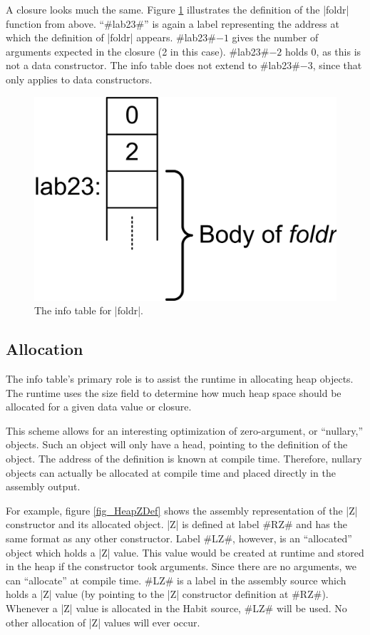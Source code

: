 \documentclass[11pt]{article}
\begin{document}
A closure looks much the same. Figure \ref{fig_foldr_Layout} illustrates the
definition of the |foldr| function from above. ``#lab23#'' is again a
label representing the address at which the definition of |foldr|
appears. #lab23#$ - 1$ gives the number of arguments expected in the
closure (2 in this case). #lab23#$ - 2$ holds 0, as this is not a data
constructor. The info table does not extend to #lab23#$ - 3$,
since that only applies to data constructors.

\begin{figure}\centering
\includegraphics{fig_foldr_Layout}
\caption{The info table for |foldr|.}
\label{fig_foldr_Layout}
\end{figure}

\subsection{Allocation}
\label{subsec_allocation}
The info table's primary role is to assist the runtime in allocating
heap objects. The runtime uses the size field to determine how much
heap space should be allocated for a given data value or closure. 

This scheme allows for an interesting optimization of zero-argument,
or ``nullary,'' objects. Such an object will only have a head,
pointing to the definition of the object. The address of the
definition is known at compile time. Therefore, nullary objects can
actually be allocated at compile time and placed directly in the
assembly output. 

For example, figure \ref{fig_HeapZDef} shows the assembly
representation of the |Z| constructor and its allocated object. |Z| is defined
at label #RZ# and has the same format as any other constructor. Label
#LZ#, however, is an ``allocated'' object which holds a |Z|
value. This value would be created at runtime and stored in the heap
if the constructor took arguments. Since there are no arguments, we
can ``allocate'' at compile time. #LZ# is a label in the assembly
source which holds a |Z| value (by pointing to the |Z| constructor
definition at #RZ#). Whenever a |Z| value is allocated in the Habit
source, #LZ# will be used. No other allocation of |Z| values will ever
occur.
\end{document}
